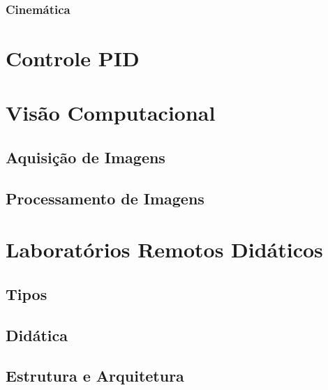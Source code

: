 \subsubsection{Cinemática}
\section{Controle PID}
\section{Visão Computacional}
\subsection{Aquisição de Imagens}
\subsection{Processamento de Imagens}
\section{Laboratórios Remotos Didáticos}
\subsection{Tipos}
\subsection{Didática}
\subsection{Estrutura e Arquitetura}

